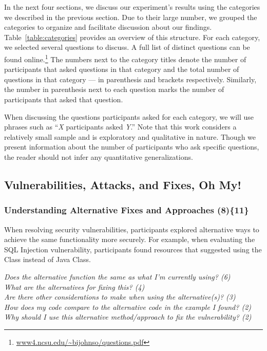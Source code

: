 \documentclass{acm_proc_article-sp}
\newcommand{\blind}[1]{#1}
\begin{document}
In the next four sections, we discuss our experiment's results using the categories we described in the previous section.
Due to their large number, we grouped the categories to organize and facilitate discussion about our findings. 
Table~\ref{table:categories} provides an overview of this structure.
For each category, we selected several questions to discuss. A full list of distinct questions can be found online.\footnote{\blind{\url{www4.ncsu.edu/~bijohnso/questions.pdf}}}
The numbers next to the category titles denote the number of participants that asked questions in that category and the total number of questions in that category --- in parenthesis and brackets respectively. Similarly, the number in parenthesis next to each question marks the number of participants that asked that question.

When discussing the questions participants asked for each category, we will use phrases such as ``\emph{X} participants asked \emph{Y}.''
Note that this work considers a relatively small sample and is exploratory and qualitative in nature.
Though we present information about the number of participants who ask specific questions, the reader should not infer any quantitative generalizations.

\subsection{Vulnerabilities, Attacks, and Fixes, Oh My!}
\label{sec:results-vaf}



\subsubsection{\textbf{Understanding Alternative Fixes and Approaches (8)\{11\}}}\label{uafa}

When resolving security vulnerabilities, participants explored alternative ways to achieve the same functionality more securely.
For example, when evaluating the SQL Injection vulnerability, participants found resources that suggested using the  Class instead of Java  Class. 

\noindent\emph{Does the alternative function the same as what I'm currently using? (6)} \\
\emph{What are the alternatives for fixing this? (4)} \\
\emph{Are there other considerations to make when using the alternative(s)? (3)} \\
\emph{How does my code compare to the alternative code in the example I found? (2)} \\
\emph{Why should I use this alternative method/approach to fix the vulnerability? (2)} 
\end{document}
